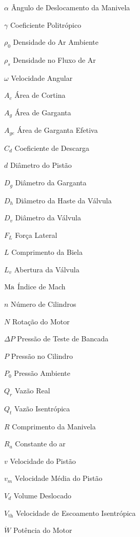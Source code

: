 \listoffigures*\clearpage   %
\begin{simbolos}
    \item[$\alpha$] Ângulo de Deslocamento da Manivela
    \item[$\gamma$] Coeficiente Politrópico
    \item[$\rho_0$] Densidade do Ar Ambiente
    \item[$\rho_s$] Densidade no Fluxo de Ar
    \item[$\omega$] Velocidade Angular
    \item[$A_c$] Área de Cortina
    \item[$A_g$] Área de Garganta
    \item[$A_{ge}$] Área de Garganta Efetiva
    \item[$C_d$] Coeficiente de  Descarga
    \item[$d$] Diâmetro do Pistão 
    \item[$D_g$] Diâmetro da Garganta
    \item[$D_h$] Diâmetro da Haste da Válvula
    \item[$D_v$] Diâmetro da Válvula
    \item[$F_L$] Força Lateral  
    \item[$L$] Comprimento da Biela
    \item[$L_v$] Abertura da Válvula 
    \item[$\text{Ma}$] Índice de Mach
    \item[$n$] Número de Cilindros
    \item[$N$] Rotação do Motor
    \item[$\Delta P$] Pressão de Teste de Bancada
    \item[$P$] Pressão no Cilindro
    \item[$P_0$] Pressão Ambiente
    \item[$Q_r$] Vazão Real
    \item[$Q_t$] Vazão Isentrópica
    \item[$R$] Comprimento da Manivela
    \item[$R_a$] Constante do ar
    \item[$v$] Velocidade do Pistão
    \item[$v_m$] Velocidade Média do Pistão 
    \item[$V_d$] Volume Deslocado 
    \item[$V_{\text{th}}$] Velocidade de Escoamento Isentrópica
    \item[$\dot{W}$] Potência do Motor
\end{simbolos}\clearpage
\tableofcontents*\clearpage %